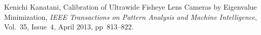 \documentclass[12pt,a4paper]{amsart}
\begin{document}
\begin{thebibliography}{MMM}

 Kenichi Kanatani, Calibration of Ultrawide Fisheye Lens Cameras by Eigenvalue Minimization,
  \emph{IEEE Transactions on Pattern Analysis and Machine Intelligence}, Vol.~35, Issue~4, April 2013, pp~813--822.

\end{thebibliography}
\end{document}
